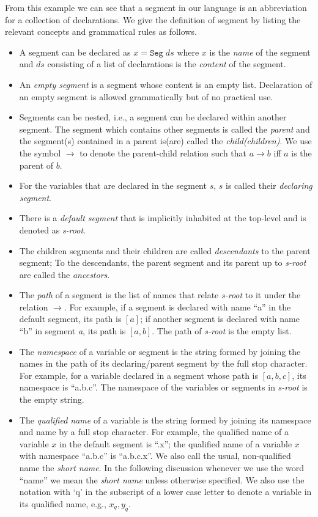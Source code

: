 From this example we can see that a segment in our language is an abbreviation for a collection of declarations. We give the definition of segment by listing the relevant concepts and grammatical rules as follows.
\begin{definition}[Segment]
  \leavevmode \vspace{-\baselineskip}
  \begin{itemize}
  \item A segment can be declared as $x = \texttt{Seg}\;ds$ where $x$ is the \emph{name} of the segment and $ds$ consisting of a list of declarations is the \emph{content} of the segment.
  \item An \emph{empty segment} is a segment whose content is an empty list. Declaration of an empty segment is allowed grammatically but of no practical use.
  \item Segments can be nested, i.e., a segment can be declared within another segment. The segment which contains other segments is called the \emph{parent} and the segment(s) contained in a parent is(are) called the \emph{child(children)}. We use the symbol $\to$ to denote the parent-child relation such that $a \to b$ iff $a$ is the parent of $b$.
  \item For the variables that are declared in the segment $s$, $s$ is called their \emph{declaring segment}. 
  \item There is a \emph{default segment} that is implicitly inhabited at the top-level and is denoted as \emph{s-root}.
  \item The children segments and their children are called \emph{descendants} to the parent segment; To the descendants, the parent segment and its parent up to \emph{s-root} are called the \emph{ancestors}.
  \item The \emph{path} of a segment is the list of names that relate \emph{s-root} to it under the relation $\to$. For example, if a segment is declared with name ``a'' in the default segment, its path is $[a]$; if another segment is declared with name ``b'' in segment \emph{a}, its path is $[a,b]$. The path of \emph{s-root} is the empty list.
  \item The \emph{namespace} of a variable or segment is the string formed by joining the names in the path of its declaring/parent segment by the full stop character. For example, for a variable declared in a segment whose path is $[a,b,c]$, its namespace is ``a.b.c''. The namespace of the variables or segments in \emph{s-root} is the empty string.
  \item The \emph{qualified name} of a variable is the string formed by joining its namespace and name by a full stop character. For example, the qualified name of a variable $x$ in the default segment is ``.x''; the qualified name of a variable $x$ with namespace ``a.b.c'' is ``a.b.c.x''. We also call the usual, non-qualified name the \emph{short name}. In the following discussion whenever we use the word ``name'' we mean the \emph{short name} unless otherwise specified. We also use the notation with `q' in the subscript of a lower case letter to denote a variable in its qualified name, e.g., $x_q, y_q$.

\end{itemize}
\end{definition}
